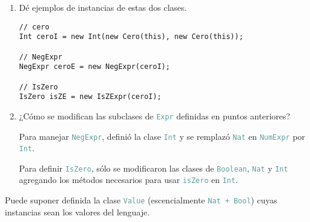 \documentclass{article}
\newcommand{\tp}[1]{\textcolor{CadetBlue} {\texttt{#1}}}
\begin{document}
\begin{enumerate}
\begin{enumerate}
\begin{itemize}
\begin{verbatim}
    /**
    * $p \land q = \neg(\neg p \lor \neg q)$
    */
    Boolean and(Boolean p) {return this.not().or(p.not()).not();}
}

// modificaciones para Nat
class Nat extends Object {
    ...
    /**
    * $a = b \iff a \leq b \land b \leq a$
    */
    Nat eq(Nat n) {return this.leq(n).and(n.leq(this));}
    ...
}

// modificacioes para Int
class Int extends Object {
    ...
    Booelan isZero(Int i) {return this.i.eq(this.d);}
    ...
}
                \end{verbatim}

                Y se usa este método para

                \begin{verbatim}
class IsZExpr extends Expr {
    Expr e;

    IsZExpr(Expr e) {super(); this.e = e;}

    Boolean isAtom() {return (new Booelan(new Nat(this))).false();}

    Expr eval() {return new BoolExpr(e.eval().v.isZero());}
}
                \end{verbatim}
            \end{itemize}

            \item Dé ejemplos de instancias de estas dos clases.

            \begin{verbatim}
// cero
Int ceroI = new Int(new Cero(this), new Cero(this));

// NegExpr
NegExpr ceroE = new NegExpr(ceroI);

// IsZero
IsZero isZE = new IsZExpr(ceroI);
            \end{verbatim}

            \item ¿Cómo se modifican las subclases de \tp{Expr} definidas en
            puntos anteriores?

            Para manejar \tp{NegExpr}, definió la clase \tp{Int} y se remplazó
            \tp{Nat} en \tp{NumExpr} por \tp{Int}.

            Para definir \tp{IsZero}, sólo se modificaron las clases de
            \tp{Boolean}, \tp{Nat} y \tp{Int} agregando los métodos necesarios
            para usar \tp{isZero} en \tp{Int}.
        \end{enumerate}

        Puede suponer definida la clase \tp{Value} (escencialmente
        \tp{Nat + Bool}) cuyas instancias sean los valores del lenguaje.


\end{enumerate}
\end{document}
